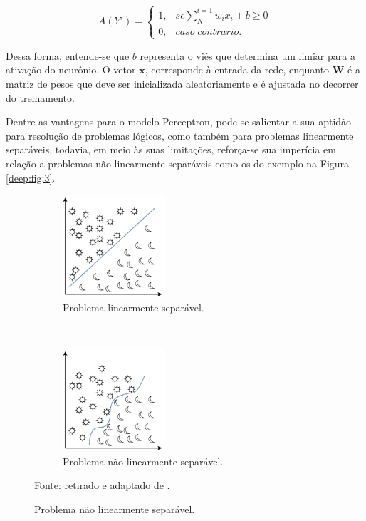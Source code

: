 \begin{equation}
    \label{deep:eq:2}
    A(Y') = \left\{\begin{matrix}
     1,& se \sum_{N}^{i=1} w_i x_i + b \geq 0 \\ 
     0,& caso \;  contrario.
    \end{matrix}\right.
\end{equation}

Dessa forma, entende-se que $b$ representa o viés que determina um limiar para a ativação do neurônio. O vetor $\textbf{x}$, corresponde à entrada da rede, enquanto $\textbf{W}$ é a matriz de pesos que deve ser inicializada aleatoriamente e é ajustada no decorrer do treinamento.

Dentre as vantagens para o modelo Perceptron, pode-se salientar a sua aptidão para resolução de problemas lógicos, como também para problemas linearmente separáveis, todavia, em meio às suas limitações, reforça-se sua imperícia em relação a problemas não linearmente separáveis como os do exemplo na Figura \ref{deep:fig:3}.

\begin{figure}[H]
   \caption{Representação de problemas linearmente e não linearmente separáveis.}
   \centering
   \label{deep:fig:3}
    \begin{subfigure}[t]{0.45\textwidth}
        \centering
        \includegraphics[height=1.5in]{recursos/imagens/deep/l_separavel.png}
        \caption{Problema linearmente separável.}
        \label{deep:fig:3.1}
    \end{subfigure}%
    ~ 
    \begin{subfigure}[t]{0.45\textwidth}
        \centering
        \includegraphics[height=1.5in]{recursos/imagens/deep/nl_separavel.png}
        \caption{Problema não linearmente separável.}
        \label{deep:fig:3.2}
    \end{subfigure}%

    \vspace*{1 cm}
    Fonte: retirado e adaptado de \cite{Goncalves}.
\end{figure}

